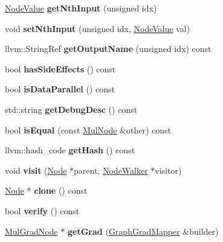 \begin{DoxyCompactItemize}
\hyperlink{structglow_1_1_node_value}{Node\+Value} {\bfseries get\+Nth\+Input} (unsigned idx)
\item 
\mbox{\label{classglow_1_1_mul_node_a39bfc503a2f74ddd22fa926486a08756}} 
void {\bfseries set\+Nth\+Input} (unsigned idx, \hyperlink{structglow_1_1_node_value}{Node\+Value} val)
\item 
\mbox{\label{classglow_1_1_mul_node_af7551b005b01b4fe3d9ac7187cb3c51a}} 
llvm\+::\+String\+Ref {\bfseries get\+Output\+Name} (unsigned idx) const
\item 
\mbox{\label{classglow_1_1_mul_node_a99a2872589bd6581bf6c9963407713ba}} 
bool {\bfseries has\+Side\+Effects} () const
\item 
\mbox{\label{classglow_1_1_mul_node_a5c3a222251d8845f772ff0606cb55b42}} 
bool {\bfseries is\+Data\+Parallel} () const
\item 
\mbox{\label{classglow_1_1_mul_node_a629adbc5b93859e00470985b4e44880f}} 
std\+::string {\bfseries get\+Debug\+Desc} () const
\item 
\mbox{\label{classglow_1_1_mul_node_a197ca4f258923030dbbd6c8990635ff0}} 
bool {\bfseries is\+Equal} (const \hyperlink{classglow_1_1_mul_node}{Mul\+Node} \&other) const
\item 
\mbox{\label{classglow_1_1_mul_node_a7a4f9ec521313297d6045d76e9dc466c}} 
llvm\+::hash\+\_\+code {\bfseries get\+Hash} () const
\item 
\mbox{\label{classglow_1_1_mul_node_a5146c15b7b2ce7fc510a3a34a036342e}} 
void {\bfseries visit} (\hyperlink{classglow_1_1_node}{Node} $\ast$parent, \hyperlink{classglow_1_1_node_walker}{Node\+Walker} $\ast$visitor)
\item 
\mbox{\label{classglow_1_1_mul_node_a4e2cf384164f304a8078a9de1bb2c741}} 
\hyperlink{classglow_1_1_node}{Node} $\ast$ {\bfseries clone} () const
\item 
\mbox{\label{classglow_1_1_mul_node_a7fd45ae97e15e05b671a9bb1f946b691}} 
bool {\bfseries verify} () const
\item 
\mbox{\label{classglow_1_1_mul_node_ad9466a7ed10c1005efde44202b85b35a}} 
\hyperlink{classglow_1_1_mul_grad_node}{Mul\+Grad\+Node} $\ast$ {\bfseries get\+Grad} (\hyperlink{classglow_1_1_graph_grad_mapper}{Graph\+Grad\+Mapper} \&builder)
\end{DoxyCompactItemize}
